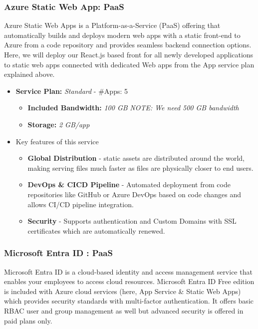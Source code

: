 \documentclass{llncs}
\begin{document}
\subsubsection{Azure Static Web App: PaaS \cite{azurestaticwebapps}} \leavevmode\newline
Azure Static Web Apps is a Platform-as-a-Service (PaaS) offering that automatically builds and deploys modern web apps with a static front-end to Azure from a code repository and provides seamless backend connection options.
Here, we will deploy our React.js based front for all newly developed applications to static web apps connected with dedicated Web apps from the App service plan explained above.
\begin{itemize}
    \item \textbf{Service Plan:} \textit{Standard} - \#Apps: 5

          \begin{itemize}
              \item \textbf{Included Bandwidth:} \textit{100 GB}
                    \textit{NOTE: We need 500 GB bandwidth}
              \item \textbf{Storage:} \textit{2 GB/app}
          \end{itemize}

    \item Key features of this service
          \begin{itemize}
              \item \textbf{Global Distribution} - static assets are distributed around the world, making serving files much faster as files are physically closer to end users.
              \item \textbf{DevOps \& CICD Pipeline} - Automated deployment from code repositories like GitHub or Azure DevOps based on code changes and allows CI/CD pipeline integration.
              \item \textbf{Security} - Supports authentication and Custom Domains with SSL certificates which are automatically renewed.
          \end{itemize}
\end{itemize}


\subsubsection{Microsoft Entra ID : PaaS} \leavevmode\newline
Microsoft Entra ID is a cloud-based identity and access management service that enables your employees to access cloud resources. Microsoft Entra ID Free edition is included with Azure cloud services (here, App Service \& Static Web Apps) which
provides security standards with multi-factor authentication.
It offers basic RBAC user and group management as well but advanced security is offered in paid plans only.
\end{document}
